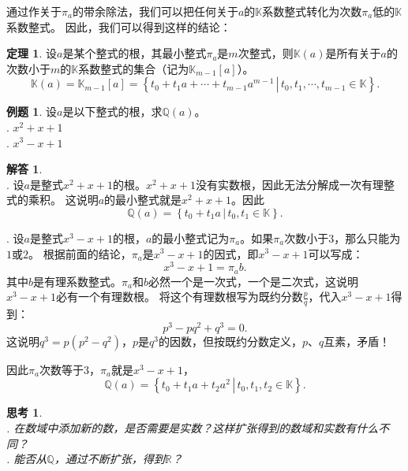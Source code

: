 \documentclass[12pt,UTF8]{ctexbook}
\theoremstyle{definition}
\newtheorem{tm}{定理}[section]
\newtheorem{et}{例题}[section]
\newtheorem*{so}{解答}
\theoremstyle{plain}
\newtheorem{sk}{思考}[section]
\begin{document}
通过作关于$\pi_a$的带余除法，我们可以把任何关于$a$的$\mathbb{K}$系数整式转化为次数$\pi_a$低的$\mathbb{K}$系数整式。
因此，我们可以得到这样的结论：

\begin{tm}
    设$a$是某个整式的根，其最小整式$\pi_a$是$m$次整式，则$\mathbb{K}(a)$是所有关于$a$的次数小于$m$的$\mathbb{K}$系数整式的集合（记为$\mathbb{K}_{m-1}[a]$）。
    $$\mathbb{K}(a) = \mathbb{K}_{m-1}[a] = \left\{\left.t_0 + t_1 a + \cdots + t_{m-1} a^{m-1} \, \right| \, t_0, t_1, \cdots , t_{m-1} \in \mathbb{K} \right\}.$$
\end{tm}

\begin{et}
    设$a$是以下整式的根，求$\mathbb{Q}(a)$。\\
    . $x^2 + x + 1 $\\
    . $x^3 - x + 1 $
\end{et}

\begin{so}
    \mbox{} \\
    . 设$a$是整式$x^2 + x + 1 $的根。$x^2 + x + 1 $没有实数根，因此无法分解成一次有理整式的乘积。
    这说明$a$的最小整式就是$x^2 + x + 1 $。因此
    $$\mathbb{Q}(a) = \left\{\left.t_0 + t_1 a \, \right| \, t_0, t_1 \in \mathbb{K} \right\}. $$
    
    . 设$a$是整式$x^3 - x + 1 $的根，$a$的最小整式记为$\pi_a$。如果$\pi_a$次数小于$3$，那么只能为$1$或$2$。
    根据前面的结论，$\pi_a$是$x^3 - x + 1 $的因式，即$x^3 - x + 1 $可以写成：
    $$x^3 - x + 1 = \pi_a b. $$
    其中$b$是有理系数整式。$\pi_a$和$b$必然一个是一次式，一个是二次式，这说明$x^3 - x + 1 $必有一个有理数根。
    将这个有理数根写为既约分数$\displaystyle \frac{p}{q}$，代入$x^3 - x + 1 $得到：
    $$ p^3 - pq^2 + q^3 = 0.$$
    这说明$q^3 = p(p^2 - q^2)$，$p$是$q^3$的因数，但按既约分数定义，$p$、$q$互素，矛盾！

    因此$\pi_a$次数等于$3$，$\pi_a$就是$x^3 - x + 1 $，
    $$\mathbb{Q}(a) = \left\{\left.t_0 + t_1 a + t_2 a^2 \, \right| \, t_0, t_1, t_2 \in \mathbb{K} \right\}. $$
\end{so}

\begin{sk}
    \mbox{} \\
    . 在数域中添加新的数，是否需要是实数？这样扩张得到的数域和实数有什么不同？\\
    . 能否从$\mathbb{Q}$，通过不断扩张，得到$\mathbb{R}$？
\end{sk}
\end{document}

